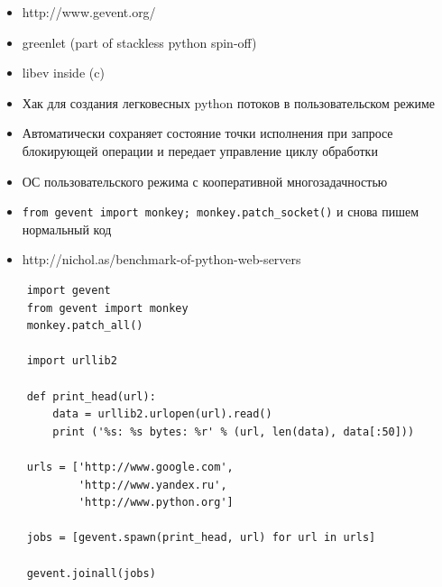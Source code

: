 \documentclass{article}
\begin{document}
\begin{itemize}
	\item http://www.gevent.org/
	\item greenlet (part of stackless python spin-off)
	\item libev inside (c)
	\item Хак для создания легковесных python потоков в пользовательском режиме
	\item Автоматически сохраняет состояние точки 
			исполнения при запросе блокирующей операции и передает управление
			  циклу обработки
	\item ОС пользовательского режима с кооперативной многозадачностью
	\item \lstinline!from gevent import monkey; monkey.patch_socket()! и снова пишем нормальный код
	\item http://nichol.as/benchmark-of-python-web-servers
\end{itemize}
\newpage
{
\Large \vspace{15pt}
\begin{lstlisting}
	import gevent
	from gevent import monkey
	monkey.patch_all()

	import urllib2

	def print_head(url):
	    data = urllib2.urlopen(url).read()
	    print ('%s: %s bytes: %r' % (url, len(data), data[:50]))

	urls = ['http://www.google.com', 
			'http://www.yandex.ru', 
			'http://www.python.org']

	jobs = [gevent.spawn(print_head, url) for url in urls]

	gevent.joinall(jobs)
\end{lstlisting}
}
\newpage
\end{document}

